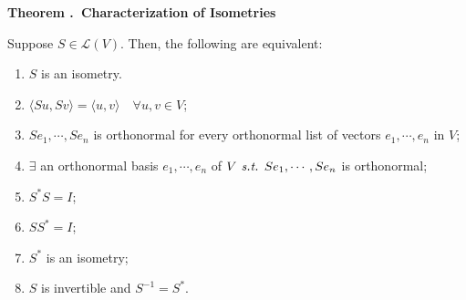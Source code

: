 \documentclass[11pt, letterpaper]{article}
\newcounter{index}[subsection]
\newenvironment*{thm}[1]{\begin{tcolorbox}\par\noindent\textbf{Theorem \thesubsection.\stepcounter{index}\theindex\ #1} \par}{\par\end{tcolorbox}}
\def\L{\mathcal{L}}
\def\st{\emph{ s.t. }}
\begin{document}
\begin{thm}{Characterization of Isometries}
	Suppose $S\in\L(V)$. Then, the following are equivalent: 
	\begin{enumerate}
		\item $S$ is an isometry.
		\item $\langle Su,Sv\rangle=\langle u,v\rangle\quad\forall u,v\in V$;
		\item $Se_1,\cdots,Se_n$ is orthonormal for every orthonormal list of vectors $e_1,\cdots,e_n$ in $V$;
		\item $\exists$ an orthonormal basis $e_1,\cdots,e_n$ of $V\st Se_1,\cdots,Se_n$ is orthonormal;
		\item $S^*S=I$;
		\item $SS^*=I$;
		\item $S^*$ is an isometry;
		\item $S$ is invertible and $S^{-1}=S^*$.
	\end{enumerate}	
\end{thm}
\end{document}
